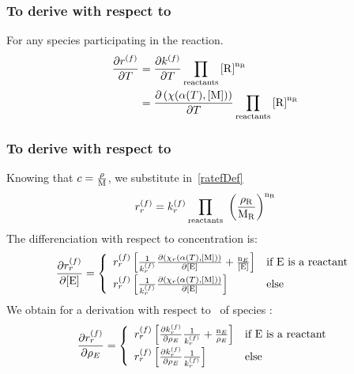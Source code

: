 \subsubsection{To derive with respect to \Temp}
For any species  participating in the reaction.
\begin{equation}
\begin{split}
\doverdT{\fwdrate} & = \doverdT{\fwdratecons} \prodReac \\
                   & = \doverdT{\left(\chemProc\right)} \prodReac \\
\end{split}
\end{equation}

\subsubsection{To derive with respect to \mass}
Knowing that $\conc = \frac{\mass}{\Mm}$, we substitute in~\ref{ratefDef}
\begin{equation}
\fwdrate[r] = \fwdratecons[r] \prod_\text{reactants}  \left(\frac{\mass[\reac]}{\Mm[\reac]}\right)^{\scoefabs[\reac]}
\end{equation}
The differenciation with respect to concentration is:
\begin{equation}
\doverdc[E]{\fwdrate[r]} = \left\{\begin{array}{ll}
                              \fwdrate[r]\left[ \frac{1}{\fwdratecons[r]} \doverdc[E]{\left(\chemProc[r]\right)} + \frac{\scoefabs[E]}{\conc[E]}\right] & \text{if \ce{E} is a reactant} \\[5pt]
                              \fwdrate[r]\left[ \frac{1}{\fwdratecons[r]} \doverdc[E]{\left(\chemProc[r]\right)}\right] & \text{else} \\
                              \end{array}\right.
\end{equation}
We obtain for a derivation with respect to \mass[E]\ of species :
\begin{equation}
\doverdm[E]{\fwdrate[r]} = \left\{\begin{array}{ll}
                             \fwdrate[r] \left[\doverdm[E]{\fwdratecons[r]} \frac{1}{\fwdratecons[r]} + \frac{\scoefabs[E]}{\mass[E]}\right] & \text{if \ce{E} is a reactant} \\[5pt]
                             \fwdrate[r] \left[\doverdm[E]{\fwdratecons[r]} \frac{1}{\fwdratecons[r]}\right] & \text{else} 
                           \end{array}\right.
\end{equation}


